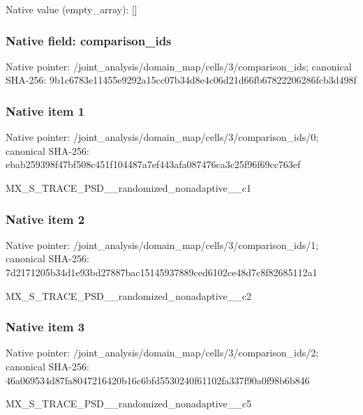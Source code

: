 \documentclass[10pt,a4paper]{article}
\begin{document}
Native value (empty\_\allowbreak{}array): []

\subsubsection{Native field: comparison\_\allowbreak{}ids}
Native pointer: /joint\_\allowbreak{}analysis/domain\_\allowbreak{}map/cells/3/comparison\_\allowbreak{}ids; canonical SHA-256: 9b1c6783e11455e9292a15cc07b34d8e4c06d21d66fb67822206286fcb3d498f

\subsubsection{Native item 1}
Native pointer: /joint\_\allowbreak{}analysis/domain\_\allowbreak{}map/cells/3/comparison\_\allowbreak{}ids/0; canonical SHA-256: ebab259398f47bf508c451f104487a7ef443afa087476ca3c25f96f69cc763ef

\begingroup\raggedright\sloppy MX\_\allowbreak{}S\_\allowbreak{}TRACE\_\allowbreak{}PSD\_\allowbreak{}\_\allowbreak{}randomized\_\allowbreak{}nonadaptive\_\allowbreak{}\_\allowbreak{}c1\par\endgroup

\subsubsection{Native item 2}
Native pointer: /joint\_\allowbreak{}analysis/domain\_\allowbreak{}map/cells/3/comparison\_\allowbreak{}ids/1; canonical SHA-256: 7d2171205b34d1e93bd27887bac15145937889ced6102ce48d7c8f82685112a1

\begingroup\raggedright\sloppy MX\_\allowbreak{}S\_\allowbreak{}TRACE\_\allowbreak{}PSD\_\allowbreak{}\_\allowbreak{}randomized\_\allowbreak{}nonadaptive\_\allowbreak{}\_\allowbreak{}c2\par\endgroup

\subsubsection{Native item 3}
Native pointer: /joint\_\allowbreak{}analysis/domain\_\allowbreak{}map/cells/3/comparison\_\allowbreak{}ids/2; canonical SHA-256: 46a069534d87fa8047216420b16c6bfd5530240f61102fa337f90a0f98b6b846

\begingroup\raggedright\sloppy MX\_\allowbreak{}S\_\allowbreak{}TRACE\_\allowbreak{}PSD\_\allowbreak{}\_\allowbreak{}randomized\_\allowbreak{}nonadaptive\_\allowbreak{}\_\allowbreak{}c5\par\endgroup
\end{document}
